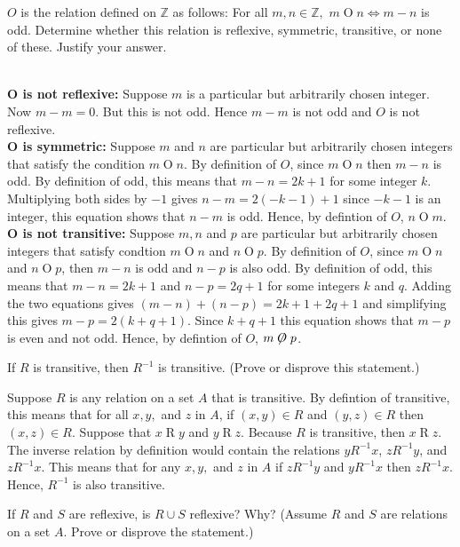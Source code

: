 \documentclass[12pt,letterpaper, onecolumn]{exam}
\begin{document}
	\begin{questions}
		\setcounter{question}{13}\question $O$ is the relation defined on $\mathbb{Z}$ as follows: For all $m,n\in\mathbb{Z},$ $m\mathrel{O}n \Leftrightarrow m-n$ is odd. Determine whether this relation is reflexive, symmetric, transitive, or none of these. Justify your answer.
		\begin{solution}\\
			\textbf{O is not reflexive:} Suppose $m$ is a particular but arbitrarily chosen integer. Now $m-m=0$. But this is not odd. Hence $m-m$ is not odd and $O$ is not reflexive.\\
			\textbf{O is symmetric:} Suppose $m$ and $n$ are particular but arbitrarily chosen integers that satisfy the condition $m\mathrel{O}n$. By definition of $O$, since $m\mathrel{O}n$ then $m-n$ is odd. By definition of odd, this means that $m-n=2k+1$ for some integer $k$. Multiplying both sides by $-1$ gives $n-m=2(-k-1)+1$ since $-k-1$ is an integer, this equation shows that $n-m$ is odd. Hence, by defintion of $O$, $n\mathrel{O}m$.\\
			\textbf{O is not transitive:} Suppose $m,n$ and $p$ are particular but arbitrarily chosen integers that satisfy condtion $m\mathrel{O}n$ and $n\mathrel{O}p$. By definition of $O$, since $m\mathrel{O}n$ and $n\mathrel{O}p$, then $m-n$ is odd and $n-p$ is also odd. By definition of odd, this means that $m-n=2k+1$ and $n-p=2q+1$ for some integers $k$ and $q$. Adding the two equations gives $(m-n)+(n-p)=2k+1+2q+1$ and simplifying this gives $m-p=2(k+q+1)$. Since $k+q+1$ this equation shows that $m-p$ is even and not odd. Hence, by defintion of $O$, $m \not \mathrel{O} p$.
		\end{solution}
		\setcounter{question}{35}\question If $R$ is transitive, then $R^{-1}$ is transitive. (Prove or disprove this statement.)
		\begin{solution}
			Suppose $R$ is any relation on  a set $A$ that is transitive. By defintion of transitive, this means that for all $x,y,$ and $z$ in $A$, if $(x,y)\in R$ and $(y,z)\in R$ then $(x,z)\in R$. Suppose that $x\mathrel{R}y$ and  $y\mathrel{R}z$. Because $R$ is transitive, then $x\mathrel{R}z$. The inverse relation by definition would contain the relations $y\mathrel{R^{-1}}x$, $z\mathrel{R^{-1}}y$, and $z\mathrel{R^{-1}}x$. This means that for any $x,y,$ and $z$ in $A$ if $z\mathrel{R^{-1}}y$ and $y\mathrel{R^{-1}}x$ then $z\mathrel{R^{-1}}x$. Hence, $R^{-1}$ is also transitive.
					\end{solution}
	\setcounter{question}{39}\question If $R$ and $S$ are reflexive, is $R\cup S$ reflexive? Why? (Assume $R$ and $S$ are relations on a set $A$. Prove or disprove the statement.)

\end{questions}
\end{document}

